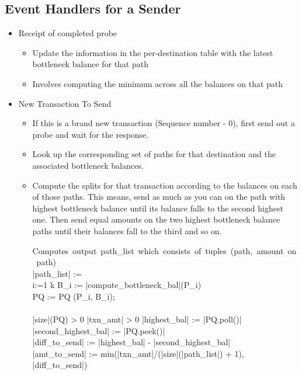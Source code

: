 \documentclass[a4paper]{article}
\begin{document}
\subsection{Event Handlers for a Sender}
\begin{itemize}
    \item Receipt of completed probe
        \begin{itemize}
            \item Update the information in the per-destination table with the latest bottleneck balance for that path
            \item Involves computing the minimum across all the balances on that path
        \end{itemize}

    \item New Transaction To Send
        \begin{itemize}

            \item If this is a brand new transaction (Sequence number - $0$), first send out a probe and wait for the response.
            \item Look up the corresponding set of paths for that destination and the associated bottleneck balances. 
            \item Compute the splits for that transaction according to the balances on each of those paths. This means, send as much as you can on the path with highest bottleneck balance 
                until its balance falls to the second highest one. Then send equal amounts on the two highest bottleneck balance paths until their balances fall to the third and so on. 
		
		\begin{program}
                \mbox{Computes output path\_list which consists of tuples (path, amount on path)}
		\BEGIN \\ %
                  |path_list| := \emptyset
                  ~\\
		  \FOR i:=1 \TO k \DO
		     B_i := |compute_bottleneck_bal|(P_i)\\ PQ := PQ \cup (P_i, B_i); %
		\END \\
                ~\\

                \DO \IF |size|(PQ) > 0 \AND |txn_amt| > 0	    
		  |highest_bal| := |PQ.poll()| %
		  \\
		  |second_highest_bal| := |PQ.peek()|\\
		  |diff_to_send| := |highest_bal| - |second_highest_bal|\\%
                  |amt_to_send| := min(|txn_amt|/(|size|(|path_list|) + 1), |diff_to_send|)
		 

\end{program}
\end{itemize}
\end{itemize}
\end{document}
